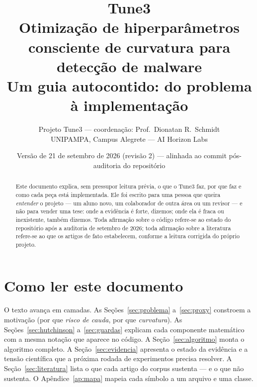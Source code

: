 \newcommand{\docshort}{Fundamentos e arquitetura}


\title{\textbf{Tune3}\\[4pt]\Large Otimização de hiperparâmetros consciente de curvatura para detecção de malware\\[6pt]
\large Um guia autocontido: do problema à implementação}
\author{Projeto Tune3 --- coordenação: Prof.\ Dionatan R.\ Schmidt\\ UNIPAMPA, Campus Alegrete --- AI Horizon Labs}
\date{Versão de 21 de setembro de 2026 (revisão 2) --- alinhada ao commit pós-auditoria do repositório }


\maketitle

\begin{abstract}
Este documento explica, sem pressupor leitura prévia, o que o Tune3 faz, por que faz e como cada peça está implementada. Ele foi escrito para uma pessoa que queira \emph{entender} o projeto --- um aluno novo, um colaborador de outra área ou um revisor --- e não para vender uma tese: onde a evidência é forte, dizemos; onde ela é fraca ou inexistente, também dizemos. Toda afirmação sobre o código refere-se ao estado do repositório após a auditoria de setembro de 2026; toda afirmação sobre a literatura refere-se ao que os artigos de fato estabelecem, conforme a leitura corrigida do próprio projeto.
\end{abstract}

\tableofcontents
\newpage

\section{Como ler este documento}

O texto avança em camadas. As Seções~\ref{sec:problema} a~\ref{sec:proxy} constroem a motivação (por que \emph{risco de cauda}, por que \emph{curvatura}). As Seções~\ref{sec:hutchinson} a~\ref{sec:guardas} explicam cada componente matemático com a mesma notação que aparece no código. A Seção~\ref{sec:algoritmo} monta o algoritmo completo. A Seção~\ref{sec:evidencia} apresenta o estado da evidência e a tensão científica que a próxima rodada de experimentos precisa resolver. A Seção~\ref{sec:literatura} lista o que cada artigo do corpus sustenta --- e o que não sustenta. O Apêndice~\ref{ap:mapa} mapeia cada símbolo a um arquivo e uma classe.

